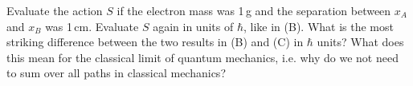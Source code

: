 \begin{solution}

\end{solution}


\begin{problem}[5]
Evaluate the action $S$ if the electron mass was 1\,g and the separation between $x_A$ and $x_B$ was 1\,cm.
Evaluate $S$ again in units of $\hbar$, like in (B).
What is the most striking difference between the two results in (B) and (C) in $\hbar$ units?
What does this mean for the classical limit of quantum mechanics, i.e. why do we not need to sum over all paths in classical mechanics?
\end{problem}

\begin{solution}

\end{solution}


